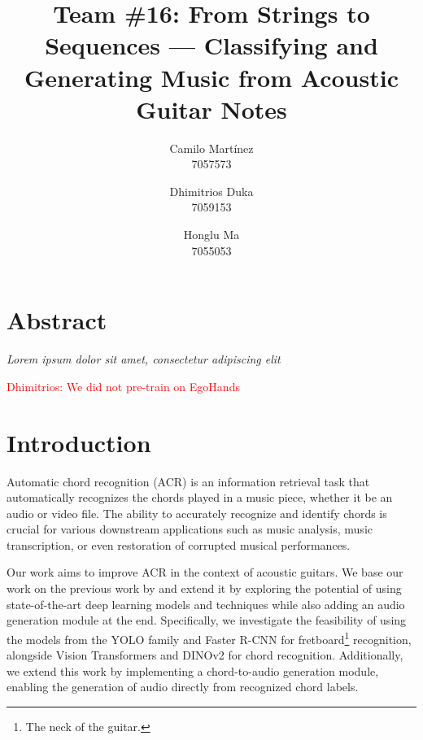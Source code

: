 \documentclass[10pt,twocolumn,letterpaper]{article}
\begin{document}
\newcommand{\dhimitrios}[1]{\textcolor{red}{Dhimitrios: #1}}

\title{Team \#16: From Strings to Sequences --- Classifying and Generating Music from Acoustic Guitar Notes}


\author{
    Camilo Martínez\\
    7057573\\
    \and
    Dhimitrios Duka\\
    7059153\\
    \and
    Honglu Ma\\
    7055053\\
}
\maketitle

\section{Abstract}
\emph{Lorem ipsum dolor sit amet, consectetur adipiscing elit}

\dhimitrios{We did not pre-train on EgoHands}

\section{Introduction}
Automatic chord recognition (ACR) is an information retrieval task that automatically recognizes the chords played in a music piece, whether it be an audio or video file. The ability to accurately recognize and identify chords is crucial for various downstream applications such as music analysis, music transcription, or even restoration of corrupted musical performances.

Our work aims to improve ACR in the context of acoustic guitars. We base our work on the previous work by \cite{Kristian_Zaman_Tenoyo_Jodhinata_2024} and extend it by exploring the potential of using state-of-the-art deep learning models and techniques while also adding an audio generation module at the end. Specifically, we investigate the feasibility of using the models from the YOLO \cite{redmon2016you} family and Faster R-CNN \cite{ren2016faster} for fretboard\footnote{The neck of the guitar.} recognition, alongside Vision Transformers \cite{dosovitskiy2020image} and DINOv2 \cite{oquab2023dinov2} for chord recognition. Additionally, we extend this work by implementing a chord-to-audio generation module, enabling the generation of audio directly from recognized chord labels.
\end{document}
